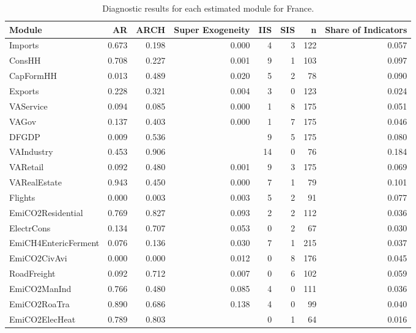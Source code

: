 \begin{table}
\centering
\caption{\label{tab:FR_diagnostics}Diagnostic results for each estimated module for France.}
\centering
\begin{tabular}[t]{lrrrrrrr}
\toprule
Module & AR & ARCH & Super Exogeneity & IIS & SIS & n & Share of Indicators\\
\midrule
Imports & 0.673 & 0.198 & 0.000 & 4 & 3 & 122 & 0.057\\
ConsHH & 0.708 & 0.227 & 0.001 & 9 & 1 & 103 & 0.097\\
CapFormHH & 0.013 & 0.489 & 0.020 & 5 & 2 & 78 & 0.090\\
Exports & 0.228 & 0.321 & 0.004 & 3 & 0 & 123 & 0.024\\
VAService & 0.094 & 0.085 & 0.000 & 1 & 8 & 175 & 0.051\\
\addlinespace
VAGov & 0.137 & 0.403 & 0.000 & 1 & 7 & 175 & 0.046\\
DFGDP & 0.009 & 0.536 &  & 9 & 5 & 175 & 0.080\\
VAIndustry & 0.453 & 0.906 &  & 14 & 0 & 76 & 0.184\\
VARetail & 0.092 & 0.480 & 0.001 & 9 & 3 & 175 & 0.069\\
VARealEstate & 0.943 & 0.450 & 0.000 & 7 & 1 & 79 & 0.101\\
\addlinespace
Flights & 0.000 & 0.003 & 0.003 & 5 & 2 & 91 & 0.077\\
EmiCO2Residential & 0.769 & 0.827 & 0.093 & 2 & 2 & 112 & 0.036\\
ElectrCons & 0.134 & 0.707 & 0.053 & 0 & 2 & 67 & 0.030\\
EmiCH4EntericFerment & 0.076 & 0.136 & 0.030 & 7 & 1 & 215 & 0.037\\
EmiCO2CivAvi & 0.000 & 0.000 & 0.012 & 0 & 8 & 176 & 0.045\\
\addlinespace
RoadFreight & 0.092 & 0.712 & 0.007 & 0 & 6 & 102 & 0.059\\
EmiCO2ManInd & 0.766 & 0.480 & 0.085 & 4 & 0 & 111 & 0.036\\
EmiCO2RoaTra & 0.890 & 0.686 & 0.138 & 4 & 0 & 99 & 0.040\\
EmiCO2ElecHeat & 0.789 & 0.803 &  & 0 & 1 & 64 & 0.016\\
\bottomrule
\end{tabular}
\end{table}
